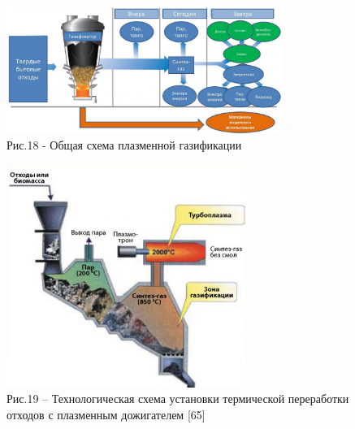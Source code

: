 \begin{figure}[H]
	\centering
	\includegraphics[width=0.8\textwidth]{media/chem2/image82}
	\caption*{Рис.18 - Общая схема плазменной газификации}
\end{figure}

\begin{figure}[H]
	\centering
	\includegraphics[width=0.7\textwidth]{media/chem2/image83}
	\caption*{Рис.19 -- Технологическая схема установки термической переработки отходов с плазменным дожигателем {[}65{]}}
\end{figure}

